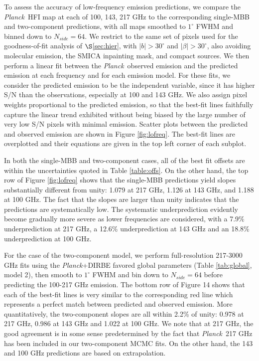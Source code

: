 \documentclass{emulateapj}
\newcommand{\PLANCK}{{\it Planck}}
\begin{document}
To assess the accuracy of low-frequency emission predictions, we compare
the \PLANCK~HFI map at each of 100, 143, 217 GHz to the corresponding 
single-MBB and two-component predictions, with all maps smoothed to 
$1^{\circ}$ FWHM and binned down to $N_{side}=64$. We restrict to the 
same set of pixels used for the goodness-of-fit analysis of 
$\S$\ref{sec:hier}, with $|b|>30^{\circ}$ and $|\beta|>30^{\circ}$, also 
avoiding molecular emission, the SMICA inpainting mask, and compact sources. We
then perform a linear fit between the \PLANCK~observed emission and the 
predicted emission at each frequency and for each emission model. For these
fits, we consider the predicted emission to be the independent variable, 
since it has higher S/N than the observations, especially at 100 and 143 GHz.
We also assign pixel weights proportional to the predicted emission, so that
the best-fit lines faithfully capture the linear trend exhibited 
without being biased by the large number of very low S/N pixels with minimal 
emission. Scatter plots between the predicted and observed emission are shown 
in Figure \ref{fig:lofreq}. The best-fit lines are overplotted and their 
equations are given in the top left corner of each subplot.

In both the single-MBB and two-component cases, all of the best fit offsets
are within the uncertainties quoted in Table \ref{table:offs}. On the other 
hand, the top row of Figure \ref{fig:lofreq} shows that the \cite{planckdust} 
single-MBB predictions yield slopes substantially different from unity: 1.079 
at 217 GHz, 1.126 at 143 GHz, and 1.188 at 100 GHz. The fact that the slopes 
are larger than unity indicates that the \cite{planckdust} predictions are 
systematically low. The systematic underprediction evidently become gradually 
more severe as lower frequencies are considered, with a 7.9\% underprediction 
at 217 GHz, a 12.6\% underprediction at 143 GHz and an 18.8\% underprediction 
at 100 GHz.

For the case of the two-component model, we perform full-resolution 217-3000 
GHz fits using the \PLANCK+DIRBE favored global parameters (Table 
\ref{tab:global}, model 2), then smooth to $1^{\circ}$ FWHM and bin down to 
$N_{side}=64$ before predicting the 100-217 GHz emission. The bottom row of
Figure 14 shows that each of the best-fit lines is very similar to the 
corresponding red line which represents a perfect match between predicted and 
observed emission. More quantitatively, the two-component slopes are all within
2.2\% of unity: 0.978 at 217 GHz, 0.986 at 143 GHz and 1.022 at 100 GHz. 
We note that at 217 GHz, the good agreement is in some sense predetermined by 
the fact that \PLANCK~217 GHz has been included in our two-component MCMC fits.
On the other hand, the 143 and 100 GHz predictions are based on extrapolation.
\end{document}
